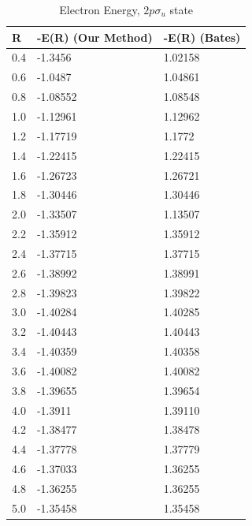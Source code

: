   \begin{table}[ht]
    \caption{Electron Energy, $ 2p\sigma_u $ state}
    \centering
  \label{tab:UsVsBates2p}
    \begin{tabular}{ m{4em}  m{4em}  m{4em} }
     \hline
     R & -E(R) (Our Method) & -E(R) (Bates)  \\ \hline \hline
     0.4 & -1.3456 & 1.02158 \\
     0.6 & -1.0487 & 1.04861 \\
     0.8 & -1.08552 & 1.08548 \\
     1.0 & -1.12961 & 1.12962 \\
     1.2 & -1.17719 & 1.1772 \\
     1.4 & -1.22415 & 1.22415 \\
     1.6 & -1.26723 & 1.26721 \\
     1.8 & -1.30446 & 1.30446 \\
     2.0 & -1.33507 & 1.13507 \\
     2.2 & -1.35912 & 1.35912 \\
     2.4 & -1.37715 & 1.37715 \\
     2.6 & -1.38992 & 1.38991 \\
     2.8 & -1.39823 & 1.39822 \\
     3.0 & -1.40284 & 1.40285 \\
     3.2 & -1.40443 & 1.40443 \\
     3.4 & -1.40359 & 1.40358 \\
     3.6 & -1.40082 & 1.40082 \\
     3.8 & -1.39655 & 1.39654 \\
     4.0 & -1.3911 & 1.39110 \\
     4.2 & -1.38477 & 1.38478 \\
     4.4 & -1.37778 & 1.37779 \\
     4.6 & -1.37033 & 1.36255 \\
     4.8 & -1.36255 & 1.36255 \\
      5.0 & -1.35458 & 1.35458 \\
     \hline
    \end{tabular}
  \end{table}

